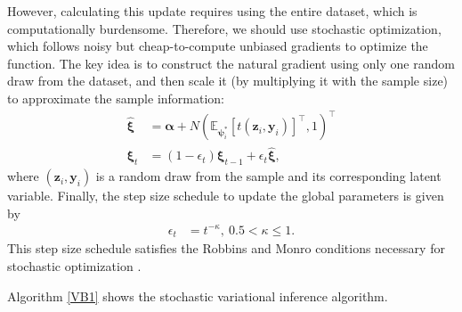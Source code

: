 However, calculating this update requires using the entire dataset, which is computationally burdensome. Therefore, we should use stochastic optimization, which follows noisy but cheap-to-compute unbiased gradients to optimize the function. The key idea is to construct the natural gradient using only one random draw from the dataset, and then scale it (by multiplying it with the sample size) to approximate the sample information:
\begin{align*}
	\hat{\boldsymbol{\xi}}&=\boldsymbol{\alpha}+N(\mathbb{E}_{\boldsymbol{\psi}_i^*}[t(\boldsymbol{z}_i,\boldsymbol{y}_i)]^{\top},1)^{\top}\\
	\boldsymbol{\xi}_t&=(1-\epsilon_t)\boldsymbol{\xi}_{t-1}+\epsilon_t\hat{\boldsymbol{\xi}},
\end{align*}
where $(\boldsymbol{z}_i, \boldsymbol{y}_i)$ is a random draw from the sample and its corresponding latent variable. Finally, the step size schedule to update the global parameters is given by
\begin{align*}
	\epsilon_t&=t^{-\kappa}, \ 0.5 < \kappa \leq 1.
\end{align*} 
This step size schedule satisfies the Robbins and Monro conditions necessary for stochastic optimization \cite{robbins1951stochastic}.

Algorithm \ref{VB1} shows the stochastic variational inference algorithm.

